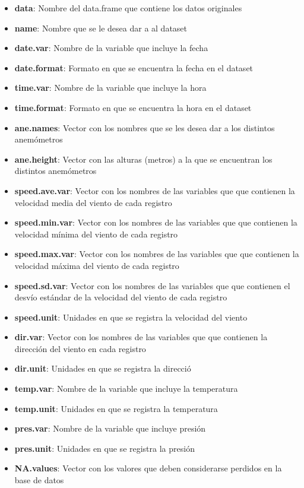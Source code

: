 \documentclass[]{article}
\begin{document}
\begin{itemize}
\itemsep1pt\parskip0pt
\item
  \textbf{data}: Nombre del data.frame que contiene los datos originales
\item
  \textbf{name}: Nombre que se le desea dar a al dataset
\item
  \textbf{date.var}: Nombre de la variable que incluye la fecha
\item
  \textbf{date.format}: Formato en que se encuentra la fecha en el
  dataset
\item
  \textbf{time.var}: Nombre de la variable que incluye la hora
\item
  \textbf{time.format}: Formato en que se encuentra la hora en el
  dataset
\item
  \textbf{ane.names}: Vector con los nombres que se les desea dar a los
  distintos anemómetros
\item
  \textbf{ane.height}: Vector con las alturas (metros) a la que se
  encuentran los distintos anemómetros
\item
  \textbf{speed.ave.var}: Vector con los nombres de las variables que
  que contienen la velocidad media del viento de cada registro
\item
  \textbf{speed.min.var}: Vector con los nombres de las variables que
  que contienen la velocidad mínima del viento de cada registro
\item
  \textbf{speed.max.var}: Vector con los nombres de las variables que
  que contienen la velocidad máxima del viento de cada registro
\item
  \textbf{speed.sd.var}: Vector con los nombres de las variables que que
  contienen el desvío estándar de la velocidad del viento de cada
  registro
\item
  \textbf{speed.unit}: Unidades en que se registra la velocidad del
  viento
\item
  \textbf{dir.var}: Vector con los nombres de las variables que que
  contienen la dirección del viento en cada registro
\item
  \textbf{dir.unit}: Unidades en que se registra la direcció
\item
  \textbf{temp.var}: Nombre de la variable que incluye la temperatura
\item
  \textbf{temp.unit}: Unidades en que se registra la temperatura
\item
  \textbf{pres.var}: Nombre de la variable que incluye presión
\item
  \textbf{pres.unit}: Unidades en que se registra la presión
\item
  \textbf{NA.values}: Vector con los valores que deben considerarse
  perdidos en la base de datos
\end{itemize}
\end{document}
